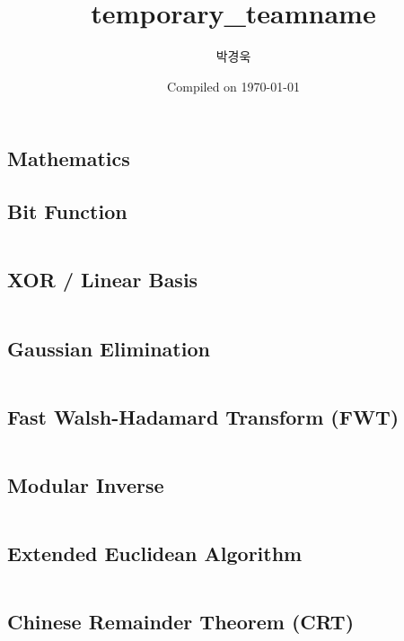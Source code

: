 \documentclass[8pt, a4paper, oneside]{extarticle}
\title{temporary\_teamname}
\author{박경욱}
\date{Compiled on \today}
\begin{document}
\begin{multicols*}{2}
{
    \Large
    \maketitle
    \tableofcontents
}
\thispagestyle{fancy}

\pagebreak

\section{Mathematics}
\subsection{Bit Function}
\inputminted{c++}{codes/mathematics/bit_function.cpp}

\subsection{XOR / Linear Basis}
\inputminted{c++}{codes/mathematics/xor_basis.cpp}

\subsection{Gaussian Elimination}
\inputminted{c++}{codes/mathematics/gaussian_elimination.cpp}

\subsection{Fast Walsh-Hadamard Transform (FWT)}
\inputminted{c++}{codes/mathematics/fwt.cpp}

\subsection{Modular Inverse}
\inputminted{c++}{codes/mathematics/modular_inverse.cpp}

\subsection{Extended Euclidean Algorithm}
\inputminted{c++}{codes/mathematics/extended_euclidean_algorithm.cpp}

\subsection{Chinese Remainder Theorem (CRT)}
\inputminted{c++}{codes/mathematics/crt.cpp}


\end{multicols*}
\end{document}
